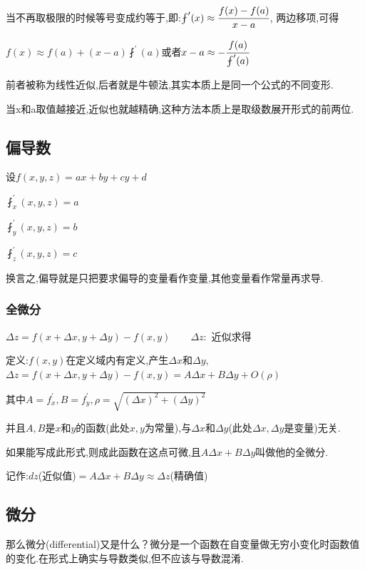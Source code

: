 \documentclass[UTF8,12pt]{ctexbook}
\newcommand{\derivative}{^\prime}
\newcommand{\partialDerivative}[1]{^\prime_{#1}}
\newcommand{\fDerivative}[1]{\fint\derivative(#1)}
\newcommand{\defFunction}[1]{f(#1)}
\begin{document}
{{{{    当不再取极限的时候等号变成约等于,即:$\fDerivative{x} \approx \cfrac{\defFunction{x} - \defFunction{a}}{x - a}$, 两边移项,可得

    $\defFunction{x} \approx \defFunction{a} + (x-a)\fDerivative{a}$或者$x - a \approx -\cfrac{\defFunction{a}}{\fDerivative{a}}$

    前者被称为线性近似,后者就是牛顿法,其实本质上是同一个公式的不同变形.

    当x和a取值越接近,近似也就越精确,这种方法本质上是取级数展开形式的前两位.

  }%

}%

\subsection{偏导数}{

  设$\defFunction{x,y,z} = ax + by + cy + d$

  $\fint\partialDerivative{x}(x,y,z) = a$

  $\fint\partialDerivative{y}(x,y,z) = b$

  $\fint\partialDerivative{z}(x,y,z) = c$

  换言之,偏导就是只把要求偏导的变量看作变量,其他变量看作常量再求导.

  \subsubsection{全微分}{

    $\Delta z = \defFunction{x + \Delta x,y + \Delta y} - \defFunction{x,y}\qquad\Delta z : $ 近似求得

    定义:$\defFunction{x,y}$在定义域内有定义,产生$\Delta x$和$\Delta y$,$\Delta z = \defFunction{x + \Delta x,y + \Delta y} - \defFunction{x,y} = A\Delta x + B\Delta y + O(\rho)$

    其中$A = f\partialDerivative{x}, B = f\partialDerivative{y}, \rho = \sqrt{(\Delta x)^2 + (\Delta y)^2}$

    并且$A,B$是$x$和$y$的函数(此处$x,y$为常量),与$\Delta x$和$\Delta y$(此处$\Delta x, \Delta y$是变量)无关.

    如果能写成此形式,则成此函数在这点可微,且$A\Delta x + B\Delta y$叫做他的全微分.

    记作:$dz$(近似值)$= A\Delta x + B\Delta y \approx \Delta z$(精确值)

  }

}%

\subsection{微分}{
那么微分(differential)又是什么？微分是一个函数在自变量做无穷小变化时函数值的变化.在形式上确实与导数类似,但不应该与导数混淆.

}}}
\end{document}
